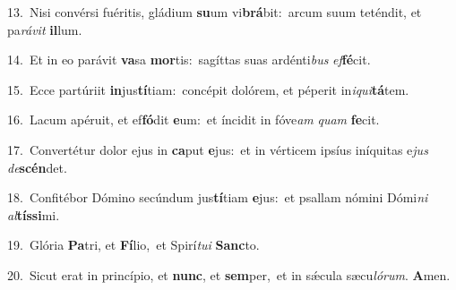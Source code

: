 {\numbfont\textcolor{\numbcolor}{13.}}~Nisi convérsi fuéritis, gládium \textbf{su}\-um vi\-\textbf{brá}\-bit:~\star arcum suum teténdit, et pa\-\textit{rá}\-\textit{vit} \textbf{il}\-lum.\par
{\numbfont\textcolor{\numbcolor}{14.}}~Et in eo parávit \textbf{va}\-sa \textbf{mor}\-tis:~\star sagíttas suas ardénti\textit{bus} \textit{ef}\-\textbf{fé}cit.\par
{\numbfont\textcolor{\numbcolor}{15.}}~Ecce partúriit \textbf{in}\-jus\-\textbf{tí}\-tiam:~\star concépit dolórem, et péperit in\-\textit{i}\-\textit{qui}\textbf{tá}tem.\par
{\numbfont\textcolor{\numbcolor}{16.}}~Lacum apéruit, et ef\-\textbf{fó}\-dit \textbf{e}\-um:~\star et íncidit in fóve\textit{am} \textit{quam} \textbf{fe}\-cit.\par
{\numbfont\textcolor{\numbcolor}{17.}}~Convertétur dolor ejus in \textbf{ca}\-put \textbf{e}\-jus:~\star et in vérticem ipsíus iníquitas e\textit{jus} \textit{de}\-\textbf{scén}det.\par
{\numbfont\textcolor{\numbcolor}{18.}}~Confitébor Dómino secúndum jus\-\textbf{tí}\-tiam \textbf{e}\-jus:~\star et psallam nómini Dómi\textit{ni} \textit{al}\-\textbf{tís}\textbf{si}mi.\par
{\numbfont\textcolor{\numbcolor}{19.}}~Glória \textbf{Pa}\-tri, et \textbf{Fí}\-lio,~\star et Spirí\-\textit{tu}\-\textit{i} \textbf{Sanc}\-to.\par
{\numbfont\textcolor{\numbcolor}{20.}}~Sicut erat in princípio, et \textbf{nunc}\-, et \textbf{sem}\-per,~\star et in sǽcula sæcu\-\textit{ló}\-\textit{rum}. \textbf{A}\-men.\par
